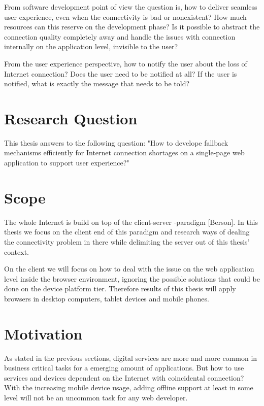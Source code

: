 From software development point of view the question is, how to deliver seamless user experience, even when the connectivity is bad or nonexistent? How much resources can this reserve on the development phase? Is it possible to abstract the connection quality completely away and handle the issues with connection internally on the application level, invisible to the user?

From the user experience perspective, how to notify the user about the loss of Internet connection? Does the user need to be notified at all? If the user is notified, what is exactly the message that needs to be told? 






\section{Research Question}
This thesis answers to the following question: "How to develope fallback mechanisms efficiently for Internet connection shortages on a single-page web application to support user experience?"






\section{Scope}
The whole Internet is build on top of the client-server -paradigm [Berson]. In this thesis we focus on the client end of this paradigm and research ways of dealing the connectivity problem in there while delimiting the server out of this thesis' context. 

On the client we will focus on how to deal with the issue on the web application level inside the browser environment, ignoring the possible solutions that could be done on the device platform tier. Therefore results of this thesis will apply browsers in desktop computers, tablet devices and mobile phones.


\section{Motivation}
As stated in the previous sections, digital services are more and more common in business critical tasks for a emerging amount of applications. But how to use services and devices dependent on the Internet with coincidental connection? With the increasing mobile device usage, adding offline support at least in some level will not be an uncommon task for any web developer.

